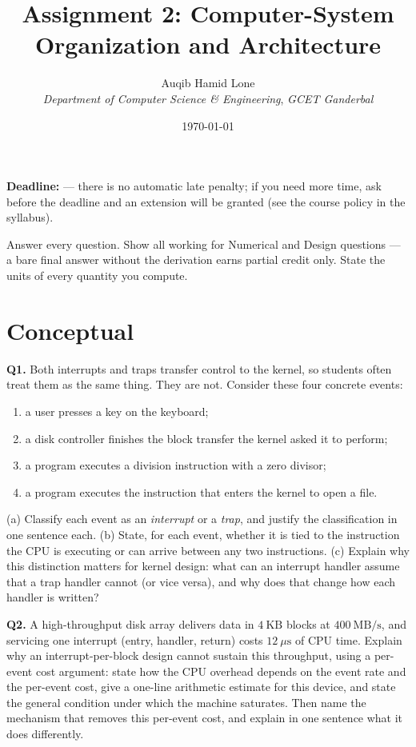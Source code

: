 \documentclass[11pt]{article}
\title{Assignment 2: Computer-System Organization and Architecture}
\author{Auqib Hamid Lone\\[0.3em]
  \emph{Department of Computer Science \& Engineering}, \emph{GCET Ganderbal}}
\date{\today}
\begin{document}
\maketitle

\noindent\textbf{Deadline:}  --- there is no automatic late penalty; if you need more time, ask before the deadline and an extension will be granted (see the course policy in the syllabus).

\noindent Answer every question. Show all working for Numerical and Design questions --- a bare final answer without the derivation earns partial credit only. State the units of every quantity you compute.

\section{Conceptual}

\textbf{Q1.} Both interrupts and traps transfer control to the kernel, so students often treat them as the same thing. They are not. Consider these four concrete events:
\begin{enumerate}
  \item[(i)] a user presses a key on the keyboard;
  \item[(ii)] a disk controller finishes the block transfer the kernel asked it to perform;
  \item[(iii)] a program executes a division instruction with a zero divisor;
  \item[(iv)] a program executes the instruction that enters the kernel to open a file.
\end{enumerate}
(a) Classify each event as an \emph{interrupt} or a \emph{trap}, and justify the classification in one sentence each. (b) State, for each event, whether it is tied to the instruction the CPU is executing or can arrive between any two instructions. (c) Explain why this distinction matters for kernel design: what can an interrupt handler assume that a trap handler cannot (or vice versa), and why does that change how each handler is written?

\textbf{Q2.} A high-throughput disk array delivers data in $4\ \text{KB}$ blocks at $400\ \text{MB/s}$, and servicing one interrupt (entry, handler, return) costs $12\ \mu\text{s}$ of CPU time. Explain why an interrupt-per-block design cannot sustain this throughput, using a per-event cost argument: state how the CPU overhead depends on the event rate and the per-event cost, give a one-line arithmetic estimate for this device, and state the general condition under which the machine saturates. Then name the mechanism that removes this per-event cost, and explain in one sentence what it does differently.
\end{document}
